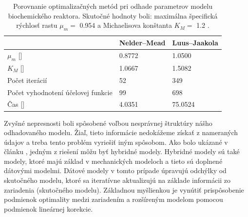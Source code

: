 \begin{table}
	\centering
	\caption{Porovnanie optimalizačných metód pri odhade parametrov modelu biochemického reaktora. Skutočné hodnoty boli: maximálna špecifická rýchlosť rastu $\mu_{m} = $ 0.954  a Michaelisova konštanta $K_{M} = $ 1.2 \unitfrac{\gram}{\liter}.}
	\label{tab: 4}
	\begin{tabular}{lll}
		\hline
		& \textbf{Nelder--Mead} & \textbf{Luus--Jaakola} \\
		\hline
		$\mu_{m}$ [\unitfrac{1}{\hour}] & 0.8772 & 1.0500 \\
		$K_{M}$ [\unitfrac{\gram}{\liter}] & 1.0667 & 1.5082 \\
		Počet iterácií & 52 & 349 \\
		Počet vyhodnotení účelovej funkcie & 99 & 698 \\
		Čas [\second] & 4.0351 & 75.0524 \\
		\hline
	\end{tabular}
\end{table}

Zvyšné nepresnosti
boli spôsobené voľbou nesprávnej štruktúry nášho odhadovaného modelu.
Žiaľ, tieto informácie nedokážeme získať z nameraných údajov a treba tento problém vyriešiť iným spôsobom. Ako bolo ukázané v článku \cite{HERNANDEZ201946}, jedným z riešení môžu byť hybridné modely. Hybridné modely sú také modely, ktoré majú základ v mechanických modeloch a tieto sú doplnené dátovými modelmi. Dátové modely v tomto prípade úpravujú odchýlky od skutočného modelu, ktoré sa iteratívne aktualizujú na základe informácii zo zariadenia (skutočného modelu). Základnou myšlienkou je vynútiť prispôsobenie podmienok optimality medzi zariadením a rozšíreným modelom pomocou podmienok lineárnej korekcie.
